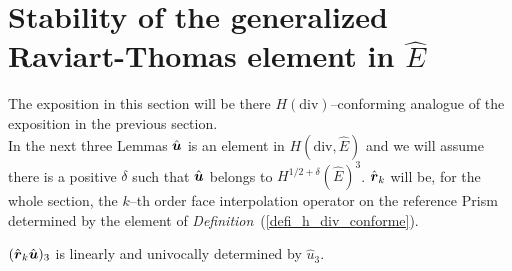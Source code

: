 \section{Stability of the generalized Raviart-Thomas element in $\hat{E}$} %
The exposition in this section will be there $H(\mbox{div})$--conforming analogue
of the exposition in the previous section.\\
\noindent In the next three Lemmas $\hat{\boldsymbol{u}}$ is an element
in $H(\mbox{div},\hat{E})$ and we will assume there is
a positive $\delta$ such that $\hat{\boldsymbol{u}}$ belongs to $H^{1/2+\delta}(\hat{E})^3$.
$\hat{\boldsymbol{r}}_k$ will be, for the whole section, the $k$--th order face 
interpolation operator on the reference
Prism determined by the element of
\emph{Definition}~(\ref{defi_h_div_conforme}).
\label{stability_of_rt_element_in_hat_k}
\begin{lemma}\label{lemmaRT3zero}
$(\hat{\boldsymbol{r}}_k\hat{\boldsymbol{u}})_3$ is linearly and univocally determined by $\hat{u}_3$.
\end{lemma}
